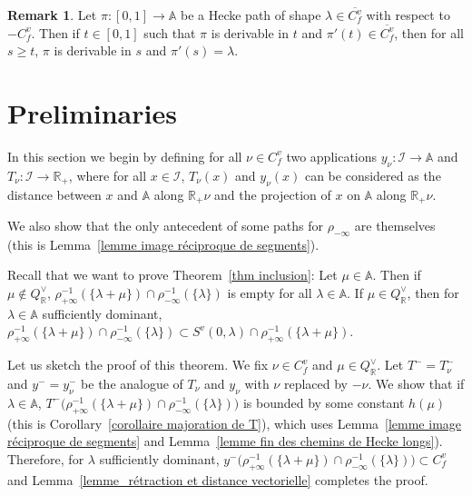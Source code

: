 \documentclass[12pt]{article}
\theoremstyle{plain}
\theoremstyle{definition}
\newtheorem{rque}[thm]{Remark}
\newcommand{\R}{\mathbb{R}}
\newcommand{\A}{\mathbb{A}}
\newcommand{\I}{\mathcal{I}}
\begin{document}
\begin{rque}\label{rque chemins de Hecke}
Let $\pi:[0,1]\rightarrow \A$ be a Hecke path of shape $\lambda\in \overline{C_f^v}$ with respect to $-C^v_f$. Then if $t\in [0,1]$ such that $\pi$ is derivable in $t$ and $\pi'(t)\in \overline{C_f^v}$, then for all $s\geq t$, $\pi$ is derivable in $s$ and $\pi'(s)=\lambda$.
\end{rque}

\section{Preliminaries}\label{sect preliminaries}

In this section we begin by defining for all $\nu\in C_f^v$ two applications $y_\nu:\I\rightarrow \A$ and $T_\nu:\I\rightarrow \R_+$, where for all $x\in \I$, $T_\nu(x)$ and $y_\nu(x)$ can be considered as the distance between $x$ and $\A$ along $\R_+\nu$ and the projection of $x$ on $\A$ along $\R_+\nu$. 

We also show that the only antecedent of some paths for $\rho_{-\infty}$ are themselves (this is Lemma~\ref{lemme image réciproque de segments}).

\vspace{3mm}
Recall that we want to prove Theorem~\ref{thm inclusion}: Let $\mu\in \A$. Then if $\mu\notin Q_{\R}^\vee$, $\rho_{+\infty}^{-1}(\{\lambda+\mu\})\cap \rho_{-\infty}^{-1}(\{\lambda\})$ is empty for all $\lambda\in \A$. If $\mu\in Q^\vee_{\R}$, then for $\lambda\in \A$ sufficiently dominant, $\rho_{+\infty}^{-1}(\{\lambda+\mu\})\cap \rho_{-\infty}^{-1}(\{\lambda\})\subset S^v(0,\lambda)\cap \rho_{+\infty}^{-1}(\{\lambda+\mu\}) $.





Let us sketch the proof of this theorem. We fix $\nu\in C_f^v$ and $\mu\in Q^\vee_\R$. Let $T^-=T_{\nu}^-$ and $y^-=y_\nu^-$ be the analogue of $T_\nu$ and $y_\nu$ with $\nu$ replaced by $-\nu$. We show that if $\lambda\in \A$, $T^-\big(\rho_{+\infty}^{-1}(\{\lambda+\mu\})\cap \rho_{-\infty}^{-1}(\{\lambda\})\big)$ is bounded by some constant $h(\mu)$ (this is Corollary~\ref{corollaire majoration de T}), which uses Lemma~\ref{lemme image réciproque de segments} and Lemma~\ref{lemme fin des chemins de Hecke longs}). Therefore, for $\lambda$ sufficiently dominant, $y^-\big(\rho_{+\infty}^{-1}(\{\lambda+\mu\})\cap \rho_{-\infty}^{-1}(\{\lambda\})\big)\subset C_f^v$ and Lemma~\ref{lemme_rétraction et distance vectorielle} completes the proof.
\end{document}
